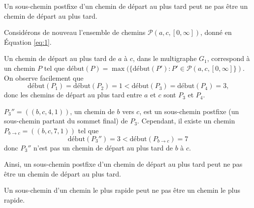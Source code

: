 \begin{assertion}
  Un sous-chemin postfixe d'un chemin de départ au plus tard peut ne pas être un
  chemin de départ au plus tard.
\end{assertion}

\begin{reponse}
  Considérons de nouveau l'ensemble de chemins $\mathcal{P}(a,c,[0, \infty])$,
  donné en Équation \ref{eq:1}.

  Un chemin de départ au plus tard de $a$ à $c$, dans le multigraphe $G_1$,
  correspond à un chemin $P$ tel que
  $\mathrm{début}(P) = \max(\{\mathrm{début}(P'): P' \in
  \mathcal{P}(a,c,[0, \infty]\})$. On observe facilement que
  \begin{equation}
    \mathrm{début}(P_1) = \mathrm{début}(P_2) = 1 < \mathrm{début}(P_3) =
    \mathrm{début}(P_4) = 3 \text{,}
  \end{equation}
  donc les chemins de départ au plus tard entre $a$ et $c$ sont $P_3$ et $P_4$.

  $P_{3}'' = ((b,c,4,1))$, un chemin de $b$ vers $c$, est un sous-chemin
  postfixe (un sous-chemin partant du sommet final) de $P_3$. Cependant, il
  existe un chemin $P_{b \rightarrow c} = ((b,c,7,1))$ tel que
  \begin{equation}
    \mathrm{début}(P_{3}'') = 3 < \mathrm{début}(P_{b \rightarrow c}) = 7
    \label{eq:5}
  \end{equation}
  donc $P_{3}''$ n'est pas un chemin de départ au plus tard de $b$ à $c$.

  Ainsi, un sous-chemin postfixe d'un chemin de départ au plus tard peut ne pas
  être un chemin de départ au plus tard.
\end{reponse}

\begin{assertion}
  Un sous-chemin d'un chemin le plus rapide peut ne pas être un chemin le plus
  rapide.
  \label{assert:rapide}
\end{assertion}

